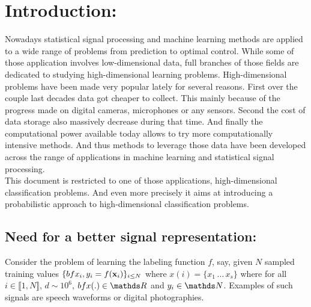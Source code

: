\documentclass[a4paper,11pt]{report}
\begin{document}
	\vfill	
		
	\newpage
	\thispagestyle{empty}
	\mbox{}
 
	\setcounter{tocdepth}{3}
	\renewcommand{\contentsname}{Contents:}
	\tableofcontents
	\clearpage

	\renewcommand{\listfigurename}{List of figures:}
	\listoffigures

\chapter{Introduction:}
	\label{chap:Intro}
	
	Nowadays statistical signal processing and machine learning methods are applied to a wide range of problems from prediction to optimal control. While some of those application involves low-dimensional data, full branches of those fields are dedicated to studying high-dimensional learning problems. High-dimensional problems have been made very popular lately for several reasons. First over the couple last decades data got cheaper to collect. This mainly because of the progress made on digital cameras, microphones or any sensors. Second the cost of data storage also massively decrease during that time. And finally the computational power available today allows to try more computationally intensive methods. And thus methods to leverage those data have been developed across the range of applications in machine learning and statistical signal processing.\\
	
	This document is restricted to one of those applications, high-dimensional classification problems. And even more precisely it aims at introducing a probabilistic approach to high-dimensional classification problems.
		   
	\section{Need for a better signal representation:}
		\label{sec:Intro/Need}
		
		Consider the problem of learning the labeling function $f$, say, given $N$ sampled training values $\{bfx_{i}, y_{i}=f({\bf x}_{i})\}_{i\leq N}$ where $x(i) =\{x_{1} \, \dots \, x_{s}\}$ where for all $i \in \llbracket 1 , N \rrbracket$, $d \sim 10^{6}$, $bfx(.) \in \dsR$ and $y_{i} \in \dsN$. Examples of such signals are speech waveforms or digital photographies.  
		
\end{document}
